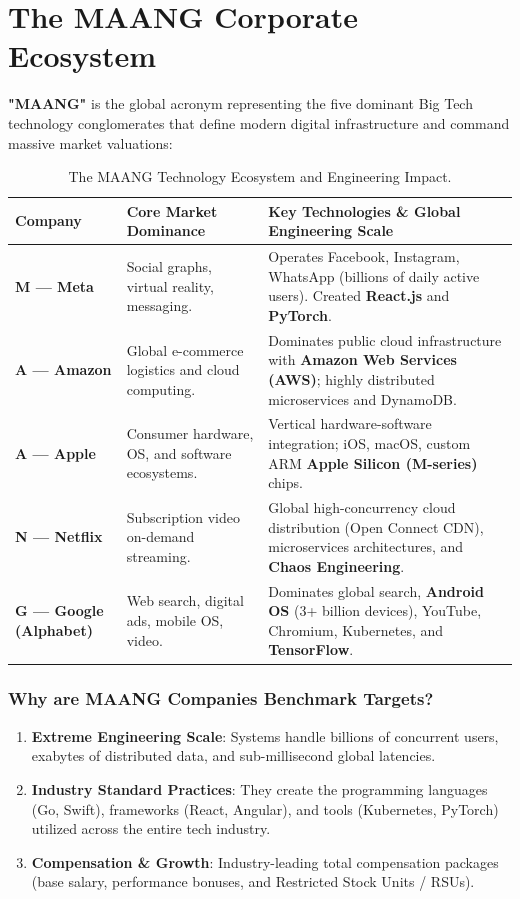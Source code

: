 \section{The MAANG Corporate Ecosystem}

\textbf{"MAANG"} is the global acronym representing the five dominant Big Tech technology conglomerates that define modern digital infrastructure and command massive market valuations:

\begin{table}[htbp]
\centering
\small
\renewcommand{\arraystretch}{1.3}
\begin{tabularx}{\linewidth}{l>{\raggedright\arraybackslash}p{3.2cm}>{\raggedright\arraybackslash}X}
\toprule
\textbf{Company} & \textbf{Core Market Dominance} & \textbf{Key Technologies \& Global Engineering Scale} \\
\midrule
\textbf{M --- Meta} & Social graphs, virtual reality, messaging. & Operates Facebook, Instagram, WhatsApp (billions of daily active users). Created \textbf{React.js} and \textbf{PyTorch}. \\
\textbf{A --- Amazon} & Global e-commerce logistics and cloud computing. & Dominates public cloud infrastructure with \textbf{Amazon Web Services (AWS)}; highly distributed microservices and DynamoDB. \\
\textbf{A --- Apple} & Consumer hardware, OS, and software ecosystems. & Vertical hardware-software integration; iOS, macOS, custom ARM \textbf{Apple Silicon (M-series)} chips. \\
\textbf{N --- Netflix} & Subscription video on-demand streaming. & Global high-concurrency cloud distribution (Open Connect CDN), microservices architectures, and \textbf{Chaos Engineering}. \\
\textbf{G --- Google (Alphabet)} & Web search, digital ads, mobile OS, video. & Dominates global search, \textbf{Android OS} (3+ billion devices), YouTube, Chromium, Kubernetes, and \textbf{TensorFlow}. \\
\bottomrule
\end{tabularx}
\caption{The MAANG Technology Ecosystem and Engineering Impact.}
\label{tab:maang-companies-master}
\end{table}

\subsubsection{Why are MAANG Companies Benchmark Targets?}
\begin{enumerate}[leftmargin=1.5em]
    \item \textbf{Extreme Engineering Scale}: Systems handle billions of concurrent users, exabytes of distributed data, and sub-millisecond global latencies.
    \item \textbf{Industry Standard Practices}: They create the programming languages (Go, Swift), frameworks (React, Angular), and tools (Kubernetes, PyTorch) utilized across the entire tech industry.
    \item \textbf{Compensation \& Growth}: Industry-leading total compensation packages (base salary, performance bonuses, and Restricted Stock Units / RSUs).
\end{enumerate}

